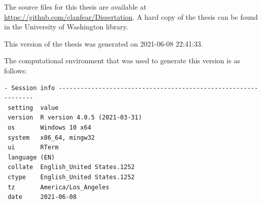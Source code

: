\documentclass [11pt, proquest] {uwthesis}[2015/03/03]
\begin{document}
The source files for this thesis are available at \url{https://github.com/clanfear/Dissertation}. A hard copy of the thesis can be found in the University of Washington library.

This version of the thesis was generated on 2021-06-08 22:41:33.

The computational environment that was used to generate this version is as follows:
\begin{verbatim}
- Session info ---------------------------------------------------------------
 setting  value                       
 version  R version 4.0.5 (2021-03-31)
 os       Windows 10 x64              
 system   x86_64, mingw32             
 ui       RTerm                       
 language (EN)                        
 collate  English_United States.1252  
 ctype    English_United States.1252  
 tz       America/Los_Angeles         
 date     2021-06-08                  


\end{verbatim}
\end{document}
